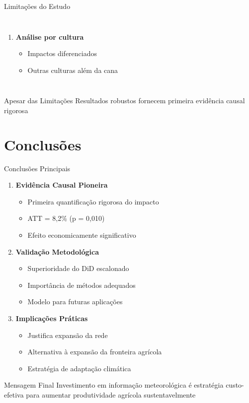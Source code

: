 \documentclass[10pt,aspectratio=169]{beamer}
\begin{document}
\begin{frame}{Limitações do Estudo}
\begin{columns}
\begin{enumerate}
    \item \textbf{Análise por cultura}
    \begin{itemize}
        \item Impactos diferenciados
        \item Outras culturas além da cana
    \end{itemize}
\end{enumerate}
\end{columns}

\begin{alertblock}{Apesar das Limitações}
Resultados robustos fornecem primeira evidência causal rigorosa
\end{alertblock}
\end{frame}

\section{Conclusões}

\begin{frame}{Conclusões Principais}
\begin{enumerate}
    \item \textbf{Evidência Causal Pioneira}
    \begin{itemize}
        \item Primeira quantificação rigorosa do impacto
        \item ATT = 8,2\% (p = 0,010)
        \item Efeito economicamente significativo
    \end{itemize}
    
    \item \textbf{Validação Metodológica}
    \begin{itemize}
        \item Superioridade do DiD escalonado
        \item Importância de métodos adequados
        \item Modelo para futuras aplicações
    \end{itemize}
    
    \item \textbf{Implicações Práticas}
    \begin{itemize}
        \item Justifica expansão da rede
        \item Alternativa à expansão da fronteira agrícola
        \item Estratégia de adaptação climática
    \end{itemize}
\end{enumerate}

\begin{block}{Mensagem Final}
Investimento em informação meteorológica é estratégia custo-efetiva para aumentar produtividade agrícola sustentavelmente
\end{block}
\end{frame}
\end{document}
